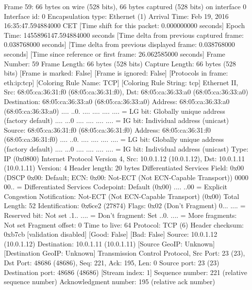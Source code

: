 Frame 59: 66 bytes on wire (528 bits), 66 bytes captured (528 bits) on interface 0
    Interface id: 0
    Encapsulation type: Ethernet (1)
    Arrival Time: Feb 19, 2016 16:35:47.594884000 CET
    [Time shift for this packet: 0.000000000 seconds]
    Epoch Time: 1455896147.594884000 seconds
    [Time delta from previous captured frame: 0.038768000 seconds]
    [Time delta from previous displayed frame: 0.038768000 seconds]
    [Time since reference or first frame: 26.062585000 seconds]
    Frame Number: 59
    Frame Length: 66 bytes (528 bits)
    Capture Length: 66 bytes (528 bits)
    [Frame is marked: False]
    [Frame is ignored: False]
    [Protocols in frame: eth:ip:tcp]
    [Coloring Rule Name: TCP]
    [Coloring Rule String: tcp]
Ethernet II, Src: 68:05:ca:36:31:f0 (68:05:ca:36:31:f0), Dst: 68:05:ca:36:33:a0 (68:05:ca:36:33:a0)
    Destination: 68:05:ca:36:33:a0 (68:05:ca:36:33:a0)
        Address: 68:05:ca:36:33:a0 (68:05:ca:36:33:a0)
        .... ..0. .... .... .... .... = LG bit: Globally unique address (factory default)
        .... ...0 .... .... .... .... = IG bit: Individual address (unicast)
    Source: 68:05:ca:36:31:f0 (68:05:ca:36:31:f0)
        Address: 68:05:ca:36:31:f0 (68:05:ca:36:31:f0)
        .... ..0. .... .... .... .... = LG bit: Globally unique address (factory default)
        .... ...0 .... .... .... .... = IG bit: Individual address (unicast)
    Type: IP (0x0800)
Internet Protocol Version 4, Src: 10.0.1.12 (10.0.1.12), Dst: 10.0.1.11 (10.0.1.11)
    Version: 4
    Header length: 20 bytes
    Differentiated Services Field: 0x00 (DSCP 0x00: Default; ECN: 0x00: Not-ECT (Not ECN-Capable Transport))
        0000 00.. = Differentiated Services Codepoint: Default (0x00)
        .... ..00 = Explicit Congestion Notification: Not-ECT (Not ECN-Capable Transport) (0x00)
    Total Length: 52
    Identification: 0x6ce2 (27874)
    Flags: 0x02 (Don't Fragment)
        0... .... = Reserved bit: Not set
        .1.. .... = Don't fragment: Set
        ..0. .... = More fragments: Not set
    Fragment offset: 0
    Time to live: 64
    Protocol: TCP (6)
    Header checksum: 0xb7cb [validation disabled]
        [Good: False]
        [Bad: False]
    Source: 10.0.1.12 (10.0.1.12)
    Destination: 10.0.1.11 (10.0.1.11)
    [Source GeoIP: Unknown]
    [Destination GeoIP: Unknown]
Transmission Control Protocol, Src Port: 23 (23), Dst Port: 48686 (48686), Seq: 221, Ack: 195, Len: 0
    Source port: 23 (23)
    Destination port: 48686 (48686)
    [Stream index: 1]
    Sequence number: 221    (relative sequence number)
    Acknowledgment number: 195    (relative ack number)
